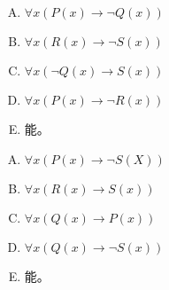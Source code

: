 {{        %
        \begin{practices}
            \begin{enumerate}[A.]
                \item $\forall x (P(x) \rightarrow \neg Q(x))$
                \item $\forall x (R(x) \rightarrow \neg S(x))$
                \item $\forall x (\neg Q(x) \rightarrow  S(x))$
                \item $\forall x (P(x) \rightarrow \neg R(x))$
                \item 能。
            \end{enumerate}
        \end{practices}

        \begin{practices}
            \begin{enumerate}[A.]
                \item $\forall x (P(x) \rightarrow \neg S(X))$
                \item $\forall x (R(x) \rightarrow S(x))$
                \item $\forall x (Q(x) \rightarrow P(x))$
                \item $\forall x (Q(x) \rightarrow \neg S(x))$
                \item 能。
            \end{enumerate}
        \end{practices}
    }
}
